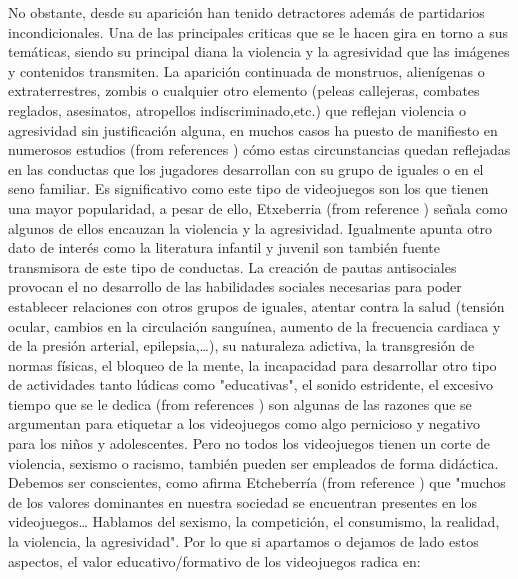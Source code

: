 \documentclass{bmcart}
\begin{document}
No obstante, desde su aparición han tenido detractores además de partidarios incondicionales. Una de las principales criticas que se le hacen gira en torno a sus temáticas, siendo su principal diana la violencia y la agresividad que las imágenes y contenidos transmiten. La aparición continuada de monstruos, alienígenas o extraterrestres, zombis o cualquier otro elemento (peleas callejeras, combates reglados, asesinatos, atropellos indiscriminado,etc.) que reflejan violencia o agresividad sin justificación alguna, en muchos casos ha puesto de manifiesto en numerosos estudios (from references \cite{anderson2000video} \cite{kirsh2003effects}) cómo estas circunstancias quedan reflejadas en las conductas que los jugadores desarrollan con su grupo de iguales o en el seno familiar. Es significativo como este tipo de videojuegos son los que tienen una mayor popularidad, a pesar de ello, Etxeberria (from reference \cite{etche}) señala como algunos de ellos encauzan la violencia y la agresividad. Igualmente apunta otro dato de interés como la literatura infantil y juvenil son también fuente transmisora de este tipo de conductas.
\newline
\newline
La creación de pautas antisociales provocan el no desarrollo de las habilidades sociales necesarias para poder establecer relaciones con otros grupos de iguales, atentar contra la salud (tensión ocular, cambios en la circulación sanguínea, aumento de la frecuencia cardiaca y de la presión arterial, epilepsia,…), su naturaleza adictiva, la transgresión de normas físicas, el bloqueo de la mente, la incapacidad para desarrollar otro tipo de actividades tanto lúdicas como "educativas", el sonido estridente, el excesivo tiempo que se le dedica (from references\cite{GRECTPPR-022840} \cite{salvat2002nuevos} \cite{rana2003microciberjuegos}) son algunas de las razones que se argumentan para etiquetar a los videojuegos como algo pernicioso y negativo para los niños y adolescentes.
\newline
\newline
Pero no todos los videojuegos tienen un corte de violencia, sexismo o racismo, también pueden ser empleados de forma didáctica. Debemos ser conscientes, como afirma Etcheberría (from reference \cite{etche}) que "muchos de los valores dominantes en nuestra sociedad se encuentran presentes en los videojuegos… Hablamos del sexismo, la competición, el consumismo, la realidad, la violencia, la agresividad". Por lo que si apartamos o dejamos de lado estos aspectos, el valor educativo/formativo de los videojuegos radica en:
\end{document}
